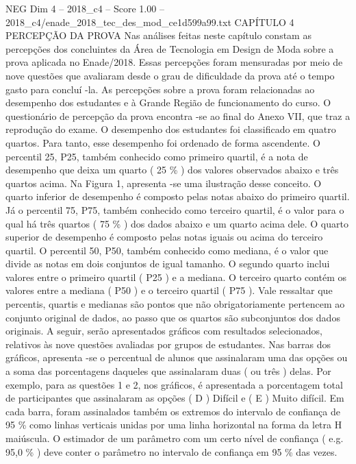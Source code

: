 \begin{textsample}{NEG Dim 4 – 2018\_c4 – Score 1.00 – 2018\_c4/enade\_2018\_tec\_des\_mod\_ce1d599a99.txt}  \label{ex:f4_neg_178}
CAPÍTULO 4 PERCEPÇÃO DA PROVA Nas análises feitas neste capítulo constam as percepções dos concluintes da Área de Tecnologia em Design de Moda sobre a prova aplicada no Enade/2018.
Essas percepções foram mensuradas por meio de nove questões que avaliaram desde o grau de dificuldade da prova até o tempo gasto para concluí -la.
As percepções sobre a prova foram relacionadas ao desempenho dos estudantes e à Grande Região de funcionamento do curso.
O questionário de percepção da prova encontra -se ao final do Anexo VII, que traz a reprodução do exame.
O desempenho dos estudantes foi classificado em quatro quartos.
Para tanto, esse desempenho foi ordenado de forma ascendente.
O percentil 25, P25, também conhecido como primeiro quartil, é a nota de desempenho que deixa um quarto ( 25 \% ) dos valores observados abaixo e três quartos acima.
Na Figura 1, apresenta -se uma ilustração desse conceito.
O quarto inferior de desempenho é composto pelas notas abaixo do primeiro quartil.
Já o percentil 75, P75, também conhecido como terceiro quartil, é o valor para o qual há três quartos ( 75 \% ) dos dados abaixo e um quarto acima dele.
O quarto superior de desempenho é composto pelas notas iguais ou acima do terceiro quartil.
O percentil 50, P50, também conhecido como mediana, é o valor que divide as notas em dois conjuntos de igual tamanho.
O segundo quarto inclui valores entre o primeiro quartil ( P25 ) e a mediana.
O terceiro quarto contém os valores entre a mediana ( P50 ) e o terceiro quartil ( P75 ).
Vale ressaltar que percentis, quartis e medianas são pontos que não obrigatoriamente pertencem ao conjunto original de dados, ao passo que os quartos são subconjuntos dos dados originais.
A seguir, serão apresentados gráficos com resultados selecionados, relativos às nove questões avaliadas por grupos de estudantes.
Nas barras dos gráficos, apresenta -se o percentual de alunos que assinalaram uma das opções ou a soma das porcentagens daqueles que assinalaram duas ( ou três ) delas.
Por exemplo, para as questões 1 e 2, nos gráficos, é apresentada a porcentagem total de participantes que assinalaram as opções ( D ) Difícil e ( E ) Muito difícil.
Em cada barra, foram assinalados também os extremos do intervalo de confiança de 95 \% como linhas verticais unidas por uma linha horizontal na forma da letra H maiúscula.
O estimador de um parâmetro com um certo nível de confiança ( e.g. 95,0 \% ) deve conter o parâmetro no intervalo de confiança em 95 \% das vezes.

\end{textsample}
